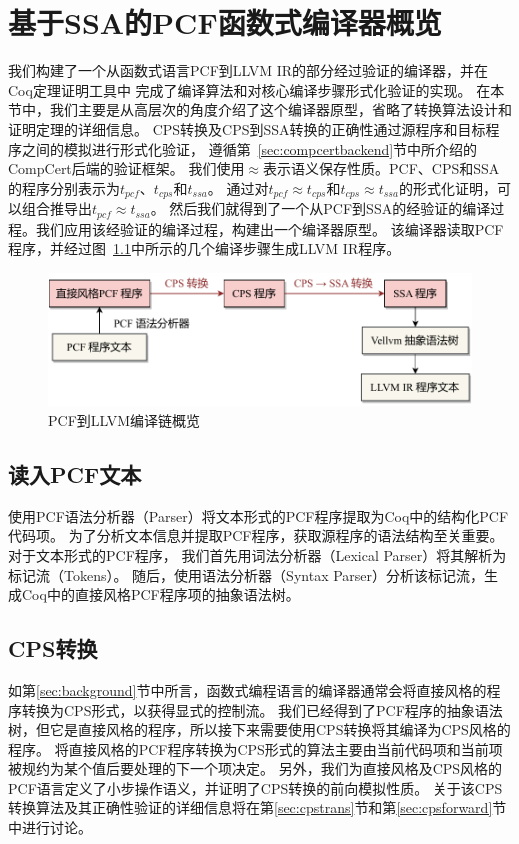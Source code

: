 
\chapter{基于SSA的PCF函数式编译器概览} \label{sec:overview}

我们构建了一个从函数式语言PCF到LLVM IR的部分经过验证的编译器，并在Coq定理证明工具中
完成了编译算法和对核心编译步骤形式化验证的实现。
在本节中，我们主要是从高层次的角度介绍了这个编译器原型，省略了转换算法设计和证明定理的详细信息。
CPS转换及CPS到SSA转换的正确性通过源程序和目标程序之间的模拟进行形式化验证，
遵循第~\ref{sec:compcertbackend}节中所介绍的CompCert后端的验证框架。
我们使用$\approx $表示语义保存性质。PCF、CPS和SSA的程序分别表示为$t_{pcf}$、$t_{cps}$和$t_{ssa}$。
通过对$t_{pcf}\approx t_{cps}$和$t_{cps}\approx t_{ssa}$的形式化证明，可以组合推导出$t_{pcf}\approx t_{ssa}$。
然后我们就得到了一个从PCF到SSA的经验证的编译过程。我们应用该经验证的编译过程，构建出一个编译器原型。
该编译器读取PCF程序，并经过图~\ref{overview}中所示的几个编译步骤生成LLVM IR程序。

\begin{figure}[htbp]
    \centering
    \vspace{2ex}
    \includegraphics[width=0.8\linewidth]{figures/overview.pdf}
    \caption{PCF到LLVM编译链概览}\label{overview}
\end{figure}

\section{读入PCF文本}

使用PCF语法分析器（Parser）将文本形式的PCF程序提取为Coq中的结构化PCF代码项。
为了分析文本信息并提取PCF程序，获取源程序的语法结构至关重要。对于文本形式的PCF程序，
我们首先用词法分析器（Lexical Parser）将其解析为标记流（Tokens）。
随后，使用语法分析器（Syntax Parser）分析该标记流，生成Coq中的直接风格PCF程序项的抽象语法树。

\section{CPS转换}

如第\ref{sec:background}节中所言，函数式编程语言的编译器通常会将直接风格的程序转换为CPS形式，以获得显式的控制流。
我们已经得到了PCF程序的抽象语法树，但它是直接风格的程序，所以接下来需要使用CPS转换将其编译为CPS风格的程序。
将直接风格的PCF程序转换为CPS形式的算法主要由当前代码项和当前项被规约为某个值后要处理的下一个项决定。
另外，我们为直接风格及CPS风格的PCF语言定义了小步操作语义，并证明了CPS转换的前向模拟性质。
关于该CPS转换算法及其正确性验证的详细信息将在第\ref{sec:cpstrans}节和第\ref{sec:cpsforward}节中进行讨论。

